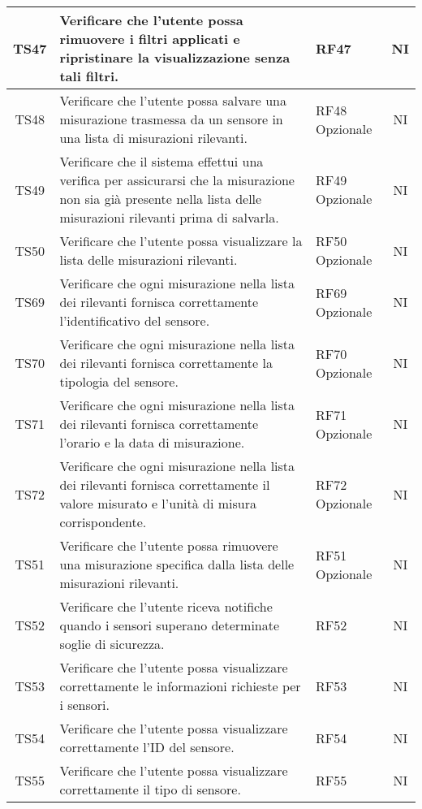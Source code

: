 \begin{longtable}{|c|p{5cm}|>{\raggedright}p{2cm}|c|}
        \hline
        TS47 & Verificare che l'utente possa rimuovere i filtri applicati e ripristinare la visualizzazione senza tali filtri. & RF47 & NI \\
        \hline
        TS48 & Verificare che l'utente possa salvare una misurazione trasmessa da un sensore in una lista di misurazioni rilevanti. & RF48 Opzionale & NI \\
        \hline
        TS49 & Verificare che il sistema effettui una verifica per assicurarsi che la misurazione non sia già presente nella lista delle misurazioni rilevanti prima di salvarla. & RF49 Opzionale & NI \\
        \hline
        TS50 & Verificare che l'utente possa visualizzare la lista delle misurazioni rilevanti. & RF50 Opzionale & NI \\
        \hline
        TS69 & Verificare che ogni misurazione nella lista dei rilevanti fornisca correttamente l'identificativo del sensore. & RF69 Opzionale & NI \\
        \hline
        TS70 & Verificare che ogni misurazione nella lista dei rilevanti fornisca correttamente la tipologia del sensore. & RF70 Opzionale & NI \\
        \hline
        TS71 & Verificare che ogni misurazione nella lista dei rilevanti fornisca correttamente l'orario e la data di misurazione. & RF71 Opzionale & NI \\
        \hline
        TS72 & Verificare che ogni misurazione nella lista dei rilevanti fornisca correttamente il valore misurato e l'unità di misura corrispondente. & RF72 Opzionale & NI \\
        \hline
        TS51 & Verificare che l'utente possa rimuovere una misurazione specifica dalla lista delle misurazioni rilevanti. & RF51 Opzionale & NI \\
        \hline
        TS52 & Verificare che l'utente riceva notifiche quando i sensori superano determinate soglie di sicurezza. & RF52 & NI \\
        \hline
        TS53 & Verificare che l'utente possa visualizzare correttamente le informazioni richieste per i sensori. & RF53 & NI \\
        \hline
        TS54 & Verificare che l'utente possa visualizzare correttamente l'ID del sensore. & RF54 & NI \\
        \hline
        TS55 & Verificare che l'utente possa visualizzare correttamente il tipo di sensore. & RF55 & NI \\
        \hline

\end{longtable}
